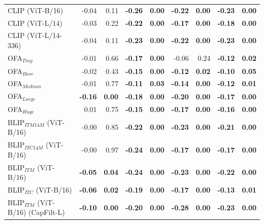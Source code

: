 \begin{table}[ht]
\begin{adjustbox}{max width=\textwidth}
\begin{tabular}{l|rr|rrrrrr}
 CLIP (ViT-B/16)                     & -0.04          & 0.11          & \textbf{-0.26} & \textbf{0.00} & \textbf{-0.22} & \textbf{0.00} & \textbf{-0.23} & \textbf{0.00} \\
 CLIP (ViT-L/14)                     & -0.03          & 0.22          & \textbf{-0.22} & \textbf{0.00} & \textbf{-0.17} & \textbf{0.00} & \textbf{-0.18} & \textbf{0.00} \\
 CLIP (ViT-L/14-336)                 & -0.04          & 0.11          & \textbf{-0.23} & \textbf{0.00} & \textbf{-0.22} & \textbf{0.00} & \textbf{-0.23} & \textbf{0.00} \\
 OFA$_{Tiny}$                        & -0.01          & 0.66          & \textbf{-0.17} & \textbf{0.00} & -0.06          & 0.24          & \textbf{-0.12} & \textbf{0.02} \\
 OFA$_{Base}$                        & -0.02          & 0.43          & \textbf{-0.15} & \textbf{0.00} & \textbf{-0.12} & \textbf{0.02} & \textbf{-0.10} & \textbf{0.05} \\
 OFA$_{Medium}$                      & -0.01          & 0.77          & \textbf{-0.11} & \textbf{0.03} & \textbf{-0.14} & \textbf{0.00} & \textbf{-0.12} & \textbf{0.01} \\
 OFA$_{Large}$                       & \textbf{-0.16} & \textbf{0.00} & \textbf{-0.18} & \textbf{0.00} & \textbf{-0.20} & \textbf{0.00} & \textbf{-0.17} & \textbf{0.00} \\
 OFA$_{Huge}$                        & 0.01           & 0.75          & \textbf{-0.15} & \textbf{0.00} & \textbf{-0.17} & \textbf{0.00} & \textbf{-0.16} & \textbf{0.00} \\
 BLIP$_{ITM 14M}$ (ViT-B/16)         & -0.00          & 0.85          & \textbf{-0.22} & \textbf{0.00} & \textbf{-0.23} & \textbf{0.00} & \textbf{-0.21} & \textbf{0.00} \\
 BLIP$_{ITC 14M}$ (ViT-B/16)         & -0.00          & 0.97          & \textbf{-0.24} & \textbf{0.00} & \textbf{-0.17} & \textbf{0.00} & \textbf{-0.17} & \textbf{0.00} \\
 BLIP$_{ITM}$ (ViT-B/16)             & \textbf{-0.05} & \textbf{0.04} & \textbf{-0.24} & \textbf{0.00} & \textbf{-0.23} & \textbf{0.00} & \textbf{-0.22} & \textbf{0.00} \\
 BLIP$_{ITC}$ (ViT-B/16)             & \textbf{-0.06} & \textbf{0.02} & \textbf{-0.19} & \textbf{0.00} & \textbf{-0.17} & \textbf{0.00} & \textbf{-0.13} & \textbf{0.01} \\
 BLIP$_{ITM}$ (ViT-B/16) (CapFilt-L) & \textbf{-0.10} & \textbf{0.00} & \textbf{-0.20} & \textbf{0.00} & \textbf{-0.28} & \textbf{0.00} & \textbf{-0.23} & \textbf{0.00} \\

\end{tabular}
\end{adjustbox}
\end{table}
